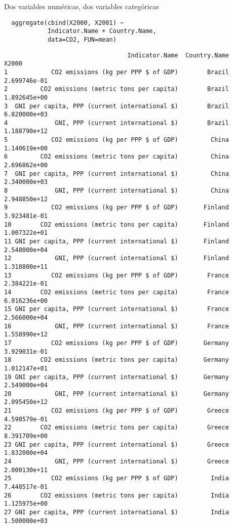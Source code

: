 \documentclass[xcolor={usenames,svgnames,dvipsnames}]{beamer}
\begin{document}
\begin{frame}[fragile,label=sec-2-2-4]{Dos variables numéricas, dos variables categóricas}
 \lstset{language=R,label= ,caption= ,numbers=none}
\begin{lstlisting}
  aggregate(cbind(X2000, X2001) ~
            Indicator.Name + Country.Name,
            data=CO2, FUN=mean)
\end{lstlisting}

\begin{verbatim}
                                  Indicator.Name  Country.Name        X2000
1            CO2 emissions (kg per PPP $ of GDP)        Brazil 2.699746e-01
2         CO2 emissions (metric tons per capita)        Brazil 1.892645e+00
3  GNI per capita, PPP (current international $)        Brazil 6.820000e+03
4             GNI, PPP (current international $)        Brazil 1.188790e+12
5            CO2 emissions (kg per PPP $ of GDP)         China 1.140619e+00
6         CO2 emissions (metric tons per capita)         China 2.696862e+00
7  GNI per capita, PPP (current international $)         China 2.340000e+03
8             GNI, PPP (current international $)         China 2.948850e+12
9            CO2 emissions (kg per PPP $ of GDP)       Finland 3.923481e-01
10        CO2 emissions (metric tons per capita)       Finland 1.007322e+01
11 GNI per capita, PPP (current international $)       Finland 2.548000e+04
12            GNI, PPP (current international $)       Finland 1.318800e+11
13           CO2 emissions (kg per PPP $ of GDP)        France 2.384221e-01
14        CO2 emissions (metric tons per capita)        France 6.016236e+00
15 GNI per capita, PPP (current international $)        France 2.566000e+04
16            GNI, PPP (current international $)        France 1.558990e+12
17           CO2 emissions (kg per PPP $ of GDP)       Germany 3.929031e-01
18        CO2 emissions (metric tons per capita)       Germany 1.012147e+01
19 GNI per capita, PPP (current international $)       Germany 2.549000e+04
20            GNI, PPP (current international $)       Germany 2.095450e+12
21           CO2 emissions (kg per PPP $ of GDP)        Greece 4.598579e-01
22        CO2 emissions (metric tons per capita)        Greece 8.391709e+00
23 GNI per capita, PPP (current international $)        Greece 1.832000e+04
24            GNI, PPP (current international $)        Greece 2.000130e+11
25           CO2 emissions (kg per PPP $ of GDP)         India 7.448517e-01
26        CO2 emissions (metric tons per capita)         India 1.125975e+00
27 GNI per capita, PPP (current international $)         India 1.500000e+03

\end{verbatim}
\end{frame}
\end{document}

